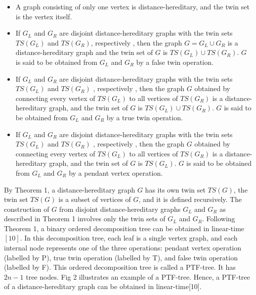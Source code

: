 \documentclass[a4paper,8pt]{article}
\theoremstyle{plain}
\begin{document}
   \begin{itemize}
       \item  A graph consisting of only one vertex is distance-hereditary, and the twin set is the vertex itself.
       
       \item If $G_L$ and $G_R$ are disjoint distance-hereditary graphs with the twin sets $TS(G_L)$ and $TS(G_R)$, respectively , then the graph $G=G_L\cup G_R$ is a distance-hereditary graph and the twin set of $G$ is $TS(G_L)\cup TS(G_R)$. $G$ is said to be obtained from $G_L$ and $G_R$ by a false twin operation.
   
   
   \item If $G_L$ and $G_R$ are disjoint distance-hereditary graphs with the twin sets $TS(G_L)$ and $TS(G_R)$ , respectively , then the graph $G$ obtained by connecting every vertex of $TS(G_L)$ to all vertices of $TS(G_R)$ is a distance-hereditary graph, and the twin set of $G$ is $TS(G_L)\cup TS(G_R)$. $G$ is said to be obtained from $G_L$    and $G_R$ by a true twin operation.
   
   \item If $G_L$ and $G_R$ are disjoint distance-hereditary graphs with the twin sets $TS(G_L)$ and $TS(G_R)$ , respectively , then the graph $G$ obtained by connecting every vertex of $TS(G_L)$ to all vertices of $TS(G_R)$ is a distance-hereditary graph, and the twin set of $G$ is $TS(G_L)$. $G$ is said to be obtained from $G_L$ and $G_R$ by a pendant vertex operation.
   
   \end{itemize}
   
  
   
   
   By Theorem 1, a distance-hereditary graph $G$ has its own twin set $TS(G)$, the twin set $TS(G)$ is a subset of vertices of $G$, and it is defined recursively. The construction of $G$ from disjoint distance-hereditary graphs $G_L$ and $G_R$ as described in Theorem 1 involves only the twin sets of $G_L$ and $G_R$. Following Theorem 1, a binary ordered decomposition tree can be obtained in linear-time $[10]$. In this decomposition tree, each leaf is a single vertex graph, and each internal node represents one of the three operations: pendant vertex operation (labelled by P), true twin operation (labelled by T), and false twin operation (labelled by F). This ordered decomposition tree is called a PTF-tree. It has $2n-
   
   1$ tree nodes. Fig 2 illustrates an example of a PTF-tree. Hence, a PTF-tree of a distance-hereditary graph can be obtained in linear-time[10].  
   
\end{document}
